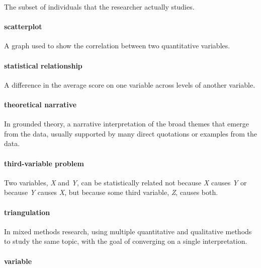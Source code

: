 \documentclass[
]{krantz}
\begin{document}
The subset of individuals that the researcher actually studies.

\paragraph*{scatterplot}\label{scatterplot}

A graph used to show the correlation between two quantitative variables.

\paragraph*{statistical relationship}\label{statistical-relationship}

A difference in the average score on one variable across levels of another variable.

\paragraph*{theoretical narrative}\label{theoretical-narrative}

In grounded theory, a narrative interpretation of the broad themes that emerge from the data, usually supported by many direct quotations or examples from the data.

\paragraph*{third-variable problem}\label{third-variable-problem}

Two variables, \emph{X} and \emph{Y}, can be statistically related not because \emph{X} causes \emph{Y} or because \emph{Y} causes \emph{X}, but because some third variable, \emph{Z}, causes both.

\paragraph*{triangulation}\label{triangulation}

In mixed methods research, using multiple quantitative and qualitative methods to study the same topic, with the goal of converging on a single interpretation.

\paragraph*{variable}\label{variable}
\end{document}
